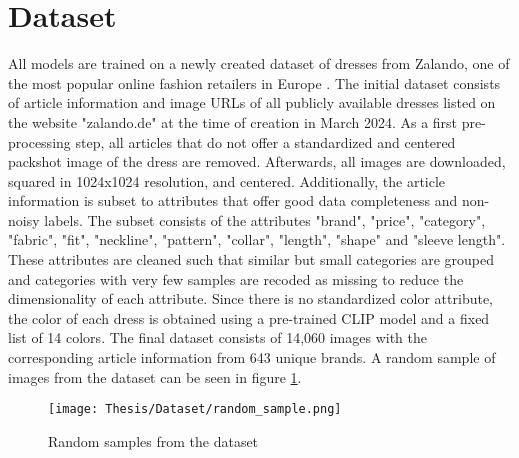 \section{Dataset}
All models are trained on a newly created dataset of dresses from Zalando, one of the most popular online fashion retailers in Europe \citep[p.1]{freno2017practical}. The initial dataset consists of article information and image URLs of all publicly available dresses listed on the website "zalando.de" at the time of creation in March 2024. As a first pre-processing step, all articles that do not offer a standardized and centered packshot image of the dress are removed. Afterwards, all images are downloaded, squared in 1024x1024 resolution, and centered. Additionally, the article information is subset to attributes that offer good data completeness and non-noisy labels. The subset consists of the attributes "brand", "price", "category", "fabric", "fit", "neckline", "pattern", "collar", "length", "shape" and "sleeve length". These attributes are cleaned such that similar but small categories are grouped and categories with very few samples are recoded as missing to reduce the dimensionality of each attribute. Since there is no standardized color attribute, the color of each dress is obtained using a pre-trained CLIP model \citep[p.2]{radford2021learning} and a fixed list of 14 colors. The final dataset consists of 14,060 images with the corresponding article information from 643 unique brands. A random sample of images from the dataset can be seen in figure \ref{fig:random_samples}.

\begin{figure}[ht]
    \centering
    \texttt{[image: Thesis/Dataset/random\_sample.png]}
    \caption{Random samples from the dataset}
    \label{fig:random_samples}
\end{figure}